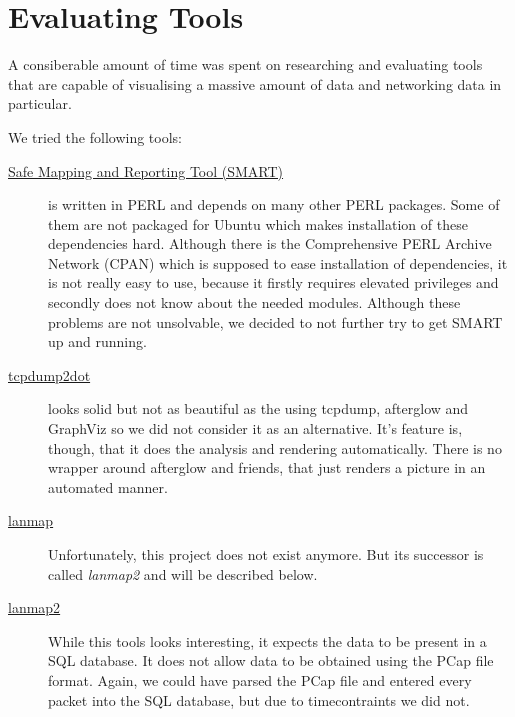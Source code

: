 \documentclass[a4paper,
    11pt,
    normalheadings,
    parindent,
    UKenglish,
    abstracton,
    ]{scrartcl}
\begin{document}
\section{Evaluating Tools} \label{sec:evaluating-tools}
A consiberable amount of time was spent on researching and evaluating tools that are capable of visualising a massive amount of data and networking data in particular.

We tried the following tools:
\begin{description}
    \item[\href{http://sourceforge.net/projects/safemap/}{Safe Mapping and Reporting Tool (SMART)}]
        is written in PERL and depends on many other PERL packages.
        Some of them are not packaged for Ubuntu which makes installation of these dependencies hard.
        Although there is the Comprehensive PERL Archive Network (CPAN) which is supposed to ease installation of dependencies, it is not really easy to use, because it firstly requires elevated privileges and secondly does not know about the needed modules.
        Although these problems are not unsolvable, we decided to not further try to get SMART up and running.

    \item[\href{http://www.grotto-group.com/~gulfie/projects/analysis/tcpdump2dot/gallery/}{tcpdump2dot}]
        looks solid but not as beautiful as the using tcpdump, afterglow and GraphViz so we did not consider it as an alternative.
        It's feature is, though, that it does the analysis and rendering automatically.
        There is no wrapper around afterglow and friends, that just renders a picture in an automated manner.


    \item[\href{http://www.parseerror.com/pizza/lanmap/}{lanmap}]
        Unfortunately, this project does not exist anymore.
        But its successor is called \emph{lanmap2} and will be described below.

    \item[\href{http://github.com/pizza/lanmap2}{lanmap2}]
        While this tools looks interesting, it expects the data to be present in a SQL database.
        It does not allow data to be obtained using the PCap file format.
        Again, we could have parsed the PCap file and entered every packet into the SQL database, but due to timecontraints we did not.


\end{description}
\end{document}
